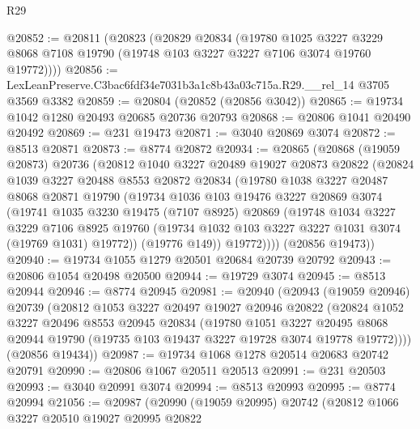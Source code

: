 \begin{lexlean}{R29}
\begin{coremodule}
@20852 := @20811
    (@20823
      (@20829
        @20834
        (@19780
          @1025
          @3227
          @3229
          @8068
          @7108
          @19790
          (@19748 @103 @3227 @3227 @7106 @3074 @19760 @19772))))
@20856 := LexLeanPreserve.C3bac6fdf34e7031b3a1c8b43a03c715a.R29.__rel_14 @3705 @3569 @3382
@20859 := @20804 (@20852 (@20856 @3042))
@20865 := @19734 @1042 @1280 @20493 @20685 @20736 @20793
@20868 := @20806 @1041 @20490 @20492
@20869 := @231 @19473
@20871 := @3040 @20869 @3074
@20872 := @8513 @20871
@20873 := @8774 @20872
@20934 := @20865
    (@20868
      (@19059 @20873)
      @20736
      (@20812
        @1040
        @3227
        @20489
        @19027
        @20873
        @20822
        (@20824
          @1039
          @3227
          @20488
          @8553
          @20872
          @20834
          (@19780
            @1038
            @3227
            @20487
            @8068
            @20871
            @19790
            (@19734
              @1036
              @103
              @19476
              @3227
              @20869
              @3074
              (@19741
                @1035
                @3230
                @19475
                (@7107 @8925)
                @20869
                (@19748
                  @1034
                  @3227
                  @3229
                  @7106
                  @8925
                  @19760
                  (@19734 @1032 @103 @3227 @3227 @1031 @3074 (@19769 @1031) @19772))
                (@19776 @149))
              @19772))))
      (@20856 @19473))
@20940 := @19734 @1055 @1279 @20501 @20684 @20739 @20792
@20943 := @20806 @1054 @20498 @20500
@20944 := @19729 @3074
@20945 := @8513 @20944
@20946 := @8774 @20945
@20981 := @20940
    (@20943
      (@19059 @20946)
      @20739
      (@20812
        @1053
        @3227
        @20497
        @19027
        @20946
        @20822
        (@20824
          @1052
          @3227
          @20496
          @8553
          @20945
          @20834
          (@19780
            @1051
            @3227
            @20495
            @8068
            @20944
            @19790
            (@19735 @103 @19437 @3227 @19728 @3074 @19778 @19772))))
      (@20856 @19434))
@20987 := @19734 @1068 @1278 @20514 @20683 @20742 @20791
@20990 := @20806 @1067 @20511 @20513
@20991 := @231 @20503
@20993 := @3040 @20991 @3074
@20994 := @8513 @20993
@20995 := @8774 @20994
@21056 := @20987
    (@20990
      (@19059 @20995)
      @20742
      (@20812
        @1066
        @3227
        @20510
        @19027
        @20995
        @20822

\end{coremodule}
\end{lexlean}
